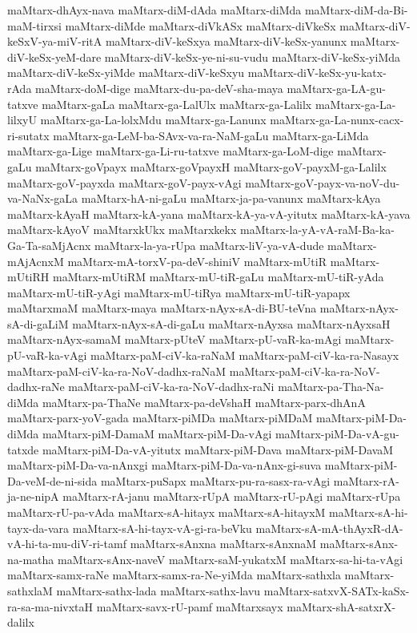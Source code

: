 {maMtarx-dhAyx-nava
maMtarx-diM-dAda
maMtarx-diMda
maMtarx-diM-da-Bi-maM-tirxsi
maMtarx-diMde
maMtarx-diVkASx
maMtarx-diVkeSx
maMtarx-diV-keSxV-ya-miV-ritA
maMtarx-diV-keSxya
maMtarx-diV-keSx-yanunx
maMtarx-diV-keSx-yeM-dare
maMtarx-diV-keSx-ye-ni-su-vudu
maMtarx-diV-keSx-yiMda
maMtarx-diV-keSx-yiMde
maMtarx-diV-keSxyu
maMtarx-diV-keSx-yu-katx-rAda
maMtarx-doM-dige
maMtarx-du-pa-deV-sha-maya
maMtarx-ga-LA-gu-tatxve
maMtarx-gaLa
maMtarx-ga-LalUlx
maMtarx-ga-Lalilx
maMtarx-ga-La-lilxyU
maMtarx-ga-La-lolxMdu
maMtarx-ga-Lanunx
maMtarx-ga-La-nunx-cacx-ri-sutatx
maMtarx-ga-LeM-ba-SAvx-va-ra-NaM-gaLu
maMtarx-ga-LiMda
maMtarx-ga-Lige
maMtarx-ga-Li-ru-tatxve
maMtarx-ga-LoM-dige
maMtarx-gaLu
maMtarx-goVpayx
maMtarx-goVpayxH
maMtarx-goV-payxM-ga-Lalilx
maMtarx-goV-payxda
maMtarx-goV-payx-vAgi
maMtarx-goV-payx-va-noV-du-va-NaNx-gaLa
maMtarx-hA-ni-gaLu
maMtarx-ja-pa-vanunx
maMtarx-kAya
maMtarx-kAyaH
maMtarx-kA-yana
maMtarx-kA-ya-vA-yitutx
maMtarx-kA-yava
maMtarx-kAyoV
maMtarxkUkx
maMtarxkekx
maMtarx-la-yA-vA-raM-Ba-ka-Ga-Ta-saMjAcnx
maMtarx-la-ya-rUpa
maMtarx-liV-ya-vA-dude
maMtarx-mAjAcnxM
maMtarx-mA-torxV-pa-deV-shiniV
maMtarx-mUtiR
maMtarx-mUtiRH
maMtarx-mUtiRM
maMtarx-mU-tiR-gaLu
maMtarx-mU-tiR-yAda
maMtarx-mU-tiR-yAgi
maMtarx-mU-tiRya
maMtarx-mU-tiR-yapapx
maMtarxmaM
maMtarx-maya
maMtarx-nAyx-sA-di-BU-teVna
maMtarx-nAyx-sA-di-gaLiM
maMtarx-nAyx-sA-di-gaLu
maMtarx-nAyxsa
maMtarx-nAyxsaH
maMtarx-nAyx-samaM
maMtarx-pUteV
maMtarx-pU-vaR-ka-mAgi
maMtarx-pU-vaR-ka-vAgi
maMtarx-paM-ciV-ka-raNaM
maMtarx-paM-ciV-ka-ra-Nasayx
maMtarx-paM-ciV-ka-ra-NoV-dadhx-raNaM
maMtarx-paM-ciV-ka-ra-NoV-dadhx-raNe
maMtarx-paM-ciV-ka-ra-NoV-dadhx-raNi
maMtarx-pa-Tha-Na-diMda
maMtarx-pa-ThaNe
maMtarx-pa-deVshaH
maMtarx-parx-dhAnA
maMtarx-parx-yoV-gada
maMtarx-piMDa
maMtarx-piMDaM
maMtarx-piM-Da-diMda
maMtarx-piM-DamaM
maMtarx-piM-Da-vAgi
maMtarx-piM-Da-vA-gu-tatxde
maMtarx-piM-Da-vA-yitutx
maMtarx-piM-Dava
maMtarx-piM-DavaM
maMtarx-piM-Da-va-nAnxgi
maMtarx-piM-Da-va-nAnx-gi-suva
maMtarx-piM-Da-veM-de-ni-sida
maMtarx-puSapx
maMtarx-pu-ra-sasx-ra-vAgi
maMtarx-rA-ja-ne-nipA
maMtarx-rA-janu
maMtarx-rUpA
maMtarx-rU-pAgi
maMtarx-rUpa
maMtarx-rU-pa-vAda
maMtarx-sA-hitayx
maMtarx-sA-hitayxM
maMtarx-sA-hi-tayx-da-vara
maMtarx-sA-hi-tayx-vA-gi-ra-beVku
maMtarx-sA-mA-thAyxR-dA-vA-hi-ta-mu-diV-ri-tamf
maMtarx-sAnxna
maMtarx-sAnxnaM
maMtarx-sAnx-na-matha
maMtarx-sAnx-naveV
maMtarx-saM-yukatxM
maMtarx-sa-hi-ta-vAgi
maMtarx-samx-raNe
maMtarx-samx-ra-Ne-yiMda
maMtarx-sathxla
maMtarx-sathxlaM
maMtarx-sathx-lada
maMtarx-sathx-lavu
maMtarx-satxvX-SATx-kaSx-ra-sa-ma-nivxtaH
maMtarx-savx-rU-pamf
maMtarxsayx
maMtarx-shA-satxrX-dalilx
}
